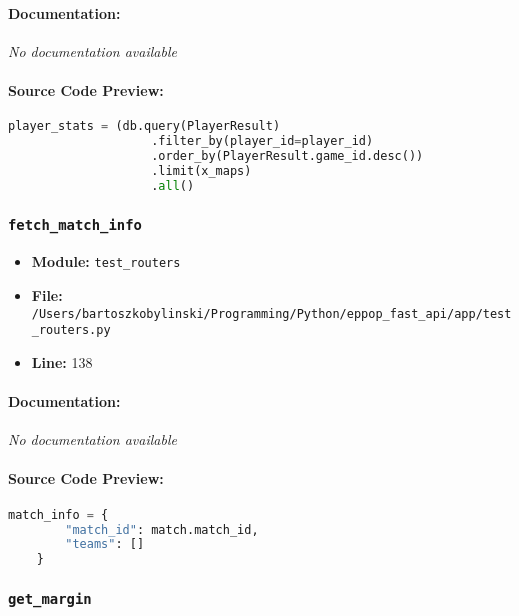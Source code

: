 \documentclass[11pt,a4paper]{article}
\begin{document}
\paragraph{Documentation:} \textit{No documentation available}

\paragraph{Source Code Preview:}
\begin{lstlisting}[language=Python]
    player_stats = (db.query(PlayerResult)
                    .filter_by(player_id=player_id)
                    .order_by(PlayerResult.game_id.desc())
                    .limit(x_maps)
                    .all()
\end{lstlisting}

\vspace{1em}
\subsubsection{\texttt{fetch\_match\_info}}

\begin{itemize}
    \item \textbf{Module:} \texttt{test\_routers}
    \item \textbf{File:} \texttt{/Users/bartoszkobylinski/Programming/Python/eppop\_fast\_api/app/test\_routers.py}
    \item \textbf{Line:} 138
\end{itemize}

\paragraph{Documentation:} \textit{No documentation available}

\paragraph{Source Code Preview:}
\begin{lstlisting}[language=Python]
    match_info = {
        "match_id": match.match_id,
        "teams": []
    }

\end{lstlisting}

\vspace{1em}
\subsubsection{\texttt{get\_margin}}
\end{document}
